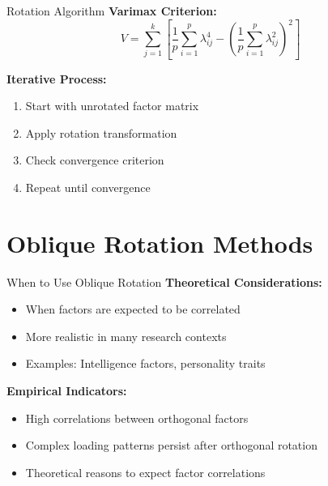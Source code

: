 \documentclass[aspectratio=169]{beamer}
\begin{document}
\begin{frame}{Rotation Algorithm}
  \textbf{Varimax Criterion:}
  $$V = \sum_{j=1}^{k} \left[ \frac{1}{p}\sum_{i=1}^{p} \lambda_{ij}^4 - \left(\frac{1}{p}\sum_{i=1}^{p} \lambda_{ij}^2\right)^2 \right]$$
  
  \textbf{Iterative Process:}
  \begin{enumerate}
    \item Start with unrotated factor matrix
    \item Apply rotation transformation
    \item Check convergence criterion
    \item Repeat until convergence
  \end{enumerate}
\end{frame}


\section{Oblique Rotation Methods}
\begin{frame}
  \sectionpage
\end{frame}

\begin{frame}{When to Use Oblique Rotation}
  \textbf{Theoretical Considerations:}
  \begin{itemize}
    \item When factors are expected to be correlated
    \item More realistic in many research contexts
    \item Examples: Intelligence factors, personality traits
  \end{itemize}
  
  \textbf{Empirical Indicators:}
  \begin{itemize}
    \item High correlations between orthogonal factors
    \item Complex loading patterns persist after orthogonal rotation
    \item Theoretical reasons to expect factor correlations
  \end{itemize}
\end{frame}
\end{document}
